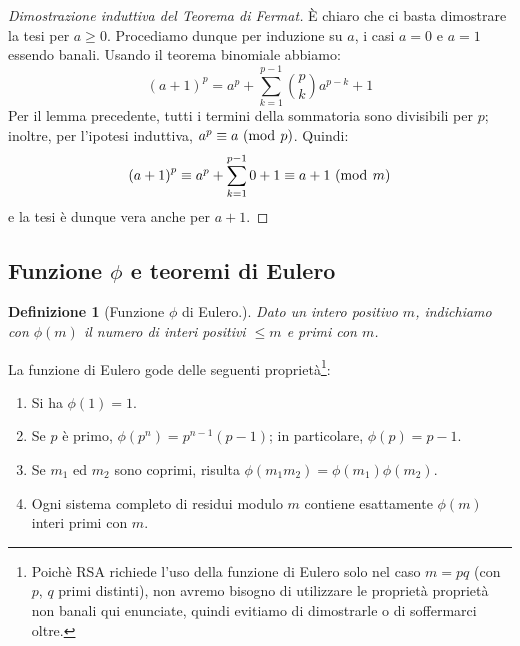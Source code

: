 \documentclass[pdflatex,11pt,a4paper,oneside]{article}
\newcommand{\p}[1]{\left({#1}\right)}
\newcommand{\ephi}[1]{\ensuremath{\phi\p{#1}}}
\newcommand{\congruent}[0]{\equiv}
\newcommand{\mmodop}[0]{\ensuremath{\operatorname{mod}}}
\newcommand{\mmod}[1]{\ensuremath{\allowbreak\ (\mmodop\:{#1})}}
\newtheorem{definition}[TheoremLike]{Definizione}
\begin{document}
\begin{proof}[Dimostrazione induttiva del Teorema di Fermat]
\`E chiaro che ci basta dimostrare la tesi per $a \geq 0$.  Procediamo
dunque per induzione su $a$, i casi $a = 0$ e $a = 1$ essendo banali.
Usando il teorema binomiale abbiamo:
\begin{displaymath}
  \p{a+1}^p = a^p + \sum_{k=1}^{p-1} \binom{p}{k}a^{p-k} + 1
\end{displaymath}
Per il lemma precedente, tutti i termini della sommatoria sono divisibili
per $p$; inoltre, per l'ipotesi induttiva, $a^p \congruent a \mmod p$.
Quindi:
\begin{displaymath}
  \p{a+1}^p \congruent a^p + \sum_{k=1}^{p-1} 0 + 1
            \congruent a + 1 \mmod m
\end{displaymath}
e la tesi \`e dunque vera anche per $a + 1$.
\end{proof}


\subsection{Funzione $\phi$ e teoremi di Eulero}

\begin{definition}[Funzione $\phi$ di Eulero.]
Dato un intero positivo $m$, indichiamo con $\ephi{m}$ il numero di interi
positivi $\leq m$ e primi con $m$.
\end{definition}

\noindent
La funzione di Eulero gode delle seguenti propriet\`a\footnote{Poich\`e
RSA richiede l'uso della funzione di Eulero solo nel caso $m = pq$ (con
$p$, $q$ primi distinti), non avremo bisogno di utilizzare le propriet\`a
propriet\`a non banali qui enunciate, quindi evitiamo di dimostrarle o di
soffermarci oltre.}:
\begin{enumerate}
  \item
    Si ha $\ephi{1} = 1$.
  \item
    Se $p$ \`e primo, $\ephi{p^n} = p^{n-1} (p - 1)$; in particolare,
    $\ephi{p} = p - 1$.
  \item
    Se $m_1$ ed $m_2$ sono coprimi, risulta
    $\ephi{m_1 m_2} = \ephi{m_1} \ephi{m_2}$.
  \item
    Ogni sistema completo di residui modulo $m$ contiene esattamente
    $\ephi{m}$ interi primi con $m$.
\end{enumerate}
\end{document}

